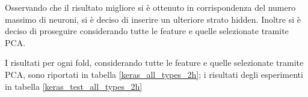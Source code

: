 \documentclass[12pt]{report}
\begin{document}
\begin{table}[H]
\end{table}


Osservando che il risultato migliore si è ottenuto in corrispondenza del numero massimo di neuroni, si è deciso di inserire un ulteriore strato hidden.
Inoltre si è deciso di proseguire considerando tutte le feature e quelle selezionate tramite PCA.

I risultati per ogni fold, considerando tutte le feature e quelle selezionate tramite PCA, sono riportati in tabella \ref{keras_all_types_2h}; i risultati degli esperimenti in tabella \ref{keras_test_all_types_2h}

\par\null\par
\end{document}
